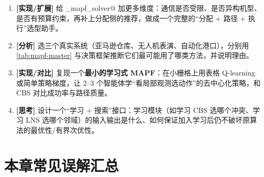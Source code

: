 \begin{exercise}
\begin{enumerate}
  \item \textbf{[实现/扩展]} 给 \verb@recommend_mapf_solver@ 加更多维度：通信是否受限、是否异构机型、是否有预算约束，再补上分配侧的推荐，做成一个完整的“分配 $+$ 路径 $+$ 执行”选型助手。
  \item \textbf{[分析]} 选三个真实系统（亚马逊仓库、无人机表演、自动化港口），分别用 \cref{tab:mapf-master} 与决策框架推断它们最可能用了哪类方法，并说明理由。
  \item \textbf{[实现/对比]} 复现一个\textbf{最小的学习式 MAPF}：在小栅格上用表格 Q-learning 或简单策略梯度，让 $2$--$3$ 个智能体学“看局部观测选动作”的去中心化策略，和 CBS 对比成功率与路径质量。
  \item \textbf{[思考]} 设计一个“学习 $+$ 搜索”接口：学习模块（如学习 CBS 选哪个冲突、学习 LNS 选哪个邻域）的输入输出是什么、如何保证加入学习后仍不破坏原算法的最优性/有界次优性。
\end{enumerate}
\end{exercise}

\section{本章常见误解汇总}
\label{sec:mapf-misconceptions}

